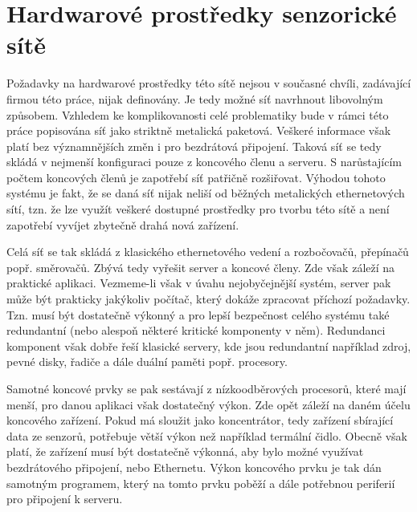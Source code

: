 \section{Hardwarové prostředky senzorické sítě}
Požadavky na hardwarové prostředky této sítě nejsou v současné chvíli, zadávající firmou této práce, nijak definovány. Je tedy možné síť navrhnout libovolným způsobem. Vzhledem ke komplikovanosti celé problematiky bude v rámci této práce popisována síť jako striktně metalická paketová. Veškeré informace však platí bez významnějších změn i pro bezdrátová připojení. Taková síť se tedy skládá v nejmenší konfiguraci pouze z koncového členu a serveru. S narůstajícím počtem koncových členů je zapotřebí síť patřičně rozšiřovat. Výhodou tohoto systému je fakt, že se daná síť nijak neliší od běžných metalických ethernetových sítí, tzn. že lze využít veškeré dostupné prostředky pro tvorbu této sítě a není zapotřebí vyvíjet zbytečně drahá nová zařízení.

Celá síť se tak skládá z klasického ethernetového vedení a rozbočovačů, přepínačů popř. směrovačů. Zbývá tedy vyřešit server a koncové členy. Zde však záleží na praktické aplikaci. Vezmeme-li však v úvahu nejobyčejnější systém, server pak může být prakticky jakýkoliv počítač, který dokáže zpracovat příchozí požadavky. Tzn. musí být dostatečně výkonný a pro lepší bezpečnost celého systému také redundantní (nebo alespoň některé kritické komponenty v něm). Redundanci komponent však dobře řeší klasické servery, kde jsou redundantní například zdroj, pevné disky, řadiče a dále duální paměti popř. procesory.

Samotné koncové prvky se pak sestávají z nízkoodběrových procesorů, které mají menší, pro danou aplikaci však dostatečný výkon. Zde opět záleží na daném účelu koncového zařízení. Pokud má sloužit jako koncentrátor, tedy zařízení sbírající data ze senzorů, potřebuje větší výkon než například termální čidlo. Obecně však platí, že zařízení musí být dostatečně výkonná, aby bylo možné využívat bezdrátového připojení, nebo Ethernetu. Výkon koncového prvku je tak dán samotným programem, který na tomto prvku poběží a dále potřebnou periferií pro připojení k serveru.

